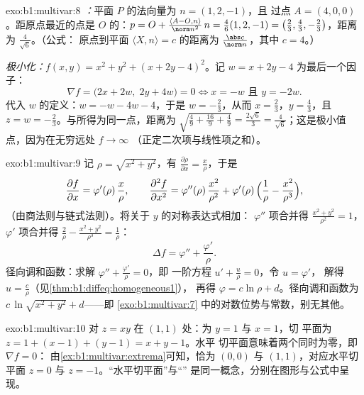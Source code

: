 \begin{solution}{exo:b1:multivar:8}
\emph{：}平面 $P$ 的法向量为 $n = (1, 2, -1)$，且
过点 $A = (4, 0, 0)$。距原点最近的点是
$O$ 的：$p = O + \frac{\langle A - O, n\rangle}{\norm
n^2}\,n = \frac{4}{6}(1,2,-1) = \bigl(\frac23, \frac43,
-\frac23\bigr)$，距离为 $\frac{4}{\sqrt 6}$。（公式：
原点到平面 $\langle X, n \rangle = c$ 的距离为
$\frac{\abs c}{\norm n}$，其中 $c = 4$。）

\emph{极小化：}$f(x,y) = x^2 + y^2 + (x + 2y - 4)^2$。记
$w = x + 2y - 4$ 为最后一个因子：
\[
\nabla f = \bigl(2x + 2w,\; 2y + 4w\bigr) = 0
\iff x = -w \text{ 且 } y = -2w .
\]
代入 $w$ 的定义：$w = -w - 4w - 4$，于是 $w =
-\frac23$，从而 $x = \frac23$，$y = \frac43$，且 $z = w =
-\frac23$。与所得为同一点，距离为
$\sqrt{\frac49 + \frac{16}{9} + \frac49} = \frac{2\sqrt 6}{3} =
\frac{4}{\sqrt6}$；这是极小值点，因为在无穷远处 $f \to \infty$
（正定二次项与线性项之和）。
\end{solution}

\begin{solution}{exo:b1:multivar:9}
记 $\rho = \sqrt{x^2+y^2}$，有 $\frac{\partial \rho}{\partial x} =
\frac{x}{\rho}$，于是
\[
\frac{\partial f}{\partial x} = \varphi'(\rho)\,\frac{x}{\rho},
\qquad
\frac{\partial^2 f}{\partial x^2}
= \varphi''(\rho)\,\frac{x^2}{\rho^2}
+ \varphi'(\rho)\,\Bigl(\frac{1}{\rho} -
\frac{x^2}{\rho^3}\Bigr),
\]
（由商法则与链式法则）。将关于 $y$ 的对称表达式相加：
$\varphi''$ 项合并得 $\frac{x^2 + y^2}{\rho^2} = 1$，
$\varphi'$ 项合并得 $\frac{2}{\rho} - \frac{x^2 +
y^2}{\rho^3} = \frac{1}{\rho}$：
\[
\Delta f = \varphi'' + \frac{\varphi'}{\rho} .
\]
径向调和函数：求解 $\varphi'' + \frac{\varphi'}{\rho} = 0$，即
一阶方程 $u' + \frac u\rho = 0$，令 $u = \varphi'$，
解得 $u = \frac{c}{\rho}$（见\cref{thm:b1:diffeq:homogeneous1}），
再得 $\varphi = c\ln\rho + d$。径向调和函数为
$c\,\ln\sqrt{x^2 + y^2} + d$——即
\cref{exo:b1:multivar:7} 中的对数位势与常数，别无其他。
\end{solution}

\begin{solution}{exo:b1:multivar:10}
对 $z = xy$ 在 $(1,1)$ 处：为 $y = 1$ 与 $x = 1$，切
平面为 $z = 1 + (x - 1) + (y - 1) = x + y - 1$。水平
切平面意味着两个同时为零，即 $\nabla f = 0$：
由\cref{ex:b1:multivar:extrema}可知，恰为
$(0, 0)$ 与 $(1, 1)$，对应水平切平面 $z = 0$ 与 $z =
-1$。“水平切平面”与“”
是同一概念，分别在图形与公式中呈现。
\end{solution}

